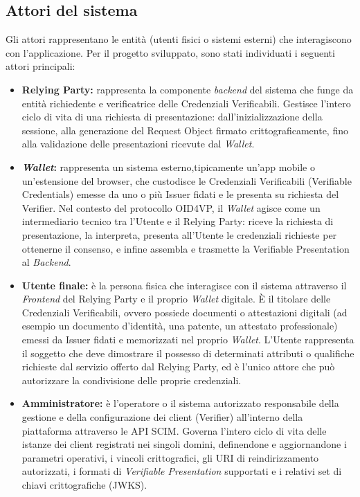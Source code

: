 \subsection{Attori del sistema}
Gli attori rappresentano le entità (utenti fisici o sistemi esterni) che interagiscono con l'applicazione. Per il progetto sviluppato, sono stati individuati i seguenti attori principali:
\begin{itemize}
    \item \textbf{Relying Party:} rappresenta la componente \textit{backend} del sistema che funge da entità richiedente e verificatrice delle Credenziali Verificabili. Gestisce l'intero ciclo di vita di una richiesta di presentazione: dall'inizializzazione della sessione, alla generazione del Request Object firmato crittograficamente, fino alla validazione delle presentazioni ricevute dal \textit{Wallet}.
    \item \textbf{\textit{Wallet}:} rappresenta un sistema esterno,tipicamente un'app mobile o un'estensione del browser, che custodisce le Credenziali Verificabili (Verifiable Credentials) emesse da uno o più Issuer fidati e le presenta su richiesta del Verifier. Nel contesto del protocollo OID4VP, il \textit{Wallet} agisce come un intermediario tecnico tra l'Utente e il Relying Party: riceve la richiesta di presentazione, la interpreta, presenta all'Utente le credenziali richieste per ottenerne il consenso, e infine assembla e trasmette la Verifiable Presentation al \textit{Backend}.
    \item \textbf{Utente finale:} è la persona fisica che interagisce con il sistema attraverso il \textit{Frontend} del Relying Party e il proprio \textit{Wallet} digitale. È il titolare delle Credenziali Verificabili, ovvero possiede documenti o attestazioni digitali (ad esempio un documento d'identità, una patente, un attestato professionale) emessi da Issuer fidati e memorizzati nel proprio \textit{Wallet}. L'Utente rappresenta il soggetto che deve dimostrare il possesso di determinati attributi o qualifiche richieste dal servizio offerto dal Relying Party, ed è l'unico attore che può autorizzare la condivisione delle proprie credenziali.
    \item \textbf{Amministratore:} è l'operatore o il sistema autorizzato responsabile della gestione e della configurazione dei client (Verifier) all'interno della piattaforma attraverso le API SCIM. Governa l'intero ciclo di vita delle istanze dei client registrati nei singoli domini, definendone e aggiornandone i parametri operativi, i vincoli crittografici, gli URI di reindirizzamento autorizzati, i formati di \textit{Verifiable Presentation} supportati e i relativi set di chiavi crittografiche (JWKS).
\end{itemize}


